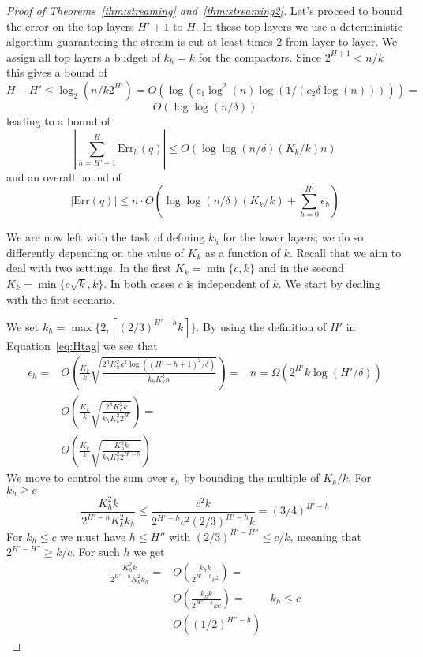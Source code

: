 \documentclass[anon,12pt]{colt2019} %
\newcommand{\eps}{\epsilon}
\newcommand{\ceil}[1]{\left \lceil #1 \right \rceil}
\newcommand{\komconstant}{c}
\begin{document}
\begin{proof} [Proof of Theorems~\ref{thm:streaming} and~\ref{thm:streaming2}]
Let's proceed to bound the error on the top layers $H'+1$ to $H$. In these top layers we use a deterministic algorithm guaranteeing the stream is cut at least times 2 from layer to layer. We assign all top layers a budget of $k_h=k$ for the compactors. Since $2^{H+1} < n/k$ this gives a bound of 
$$
H-H' \leq \log_2(n/k2^{H'}) = O\left( \log\left( c_1 \log^2(n) \log(1/(c_2 \delta \log(n))) \right)\right) = 
$$
$$
O\left( \log \log(n/\delta) \right)
$$
leading to a bound of 
$$ \left| \sum_{h=H'+1}^H \text{Err}_h(q) \right| \leq O\left( \log \log(n/\delta) (K_k/k) n \right) $$
and an overall bound of
\begin{equation} \label{eq:err total}
|\text{Err}(q)| \leq n \cdot O\left( \log \log(n/\delta)(K_k/k) + \sum_{h=0}^{H'} \eps_h \right)
\end{equation}

We are now left with the task of defining $k_h$ for the lower layers; we do so differently depending on the value of $K_k$ as a function of $k$. Recall that we aim to deal with two settings. In the first $K_k=\min\{\komconstant,k\}$ and in the second $K_k=\min\{\komconstant \sqrt{k}, k\}$. In both cases  $\komconstant$ is independent of $k$. We start by dealing with the first scenario.

We set $k_h = \max\{2, \ceil{(2/3)^{H'-h}k}\}$. By using the definition of $H'$ in Equation~\eqref{eq:Htag} we see that
\begin{align*}
\eps_h = & O\left( \frac{K_k}{k} \sqrt{\frac{2^h K_h^2 k^2 \log((H'-h+1)^2/\delta)}{k_h K_k^2 n}} \right) = & n=\Omega(2^{H'}k\log(H'/\delta)) \\
  	   &  O\left( \frac{K_k}{k} \sqrt{\frac{2^h K_h^2 k }{k_h K_k^2 2^{H'}}} \right) = \\
    	   &  O\left( \frac{K_k}{k} \sqrt{\frac{K_h^2 k }{k_h K_k^2 2^{H'-h}}} \right)
\end{align*}
We move to control the sum over $\eps_h$ by bounding the multiple of $K_k/k$. For $k_h \geq \komconstant$
$$
\frac{K_h^2 k}{2^{H'-h} K_k^2 k_{h}} \leq \frac{\komconstant^2 k}{2^{H'-h} \komconstant^2 (2/3)^{H'-h}k} =
(3/4)^{H'-h}
$$
For $k_h \leq \komconstant$ we must have $h \leq H''$ with $(2/3)^{H'-H''} \leq \komconstant/k$, meaning that $2^{H'-H''} \geq k/\komconstant$. For such $h$ we get
\begin{align*}
 \frac{K_h^2 k}{2^{H'-h} K_k^2 k_{h}} = &  O\left( \frac{ k_h k}{2^{H'-h} \komconstant^2 } \right) =  \\
    	   &  O\left( \frac{ k_h k}{2^{H''-h} k\komconstant } \right) = & k_h \leq \komconstant\\
	   &  O\left( (1/2)^{H''-h}   \right) 
\end{align*}


\end{proof}
\end{document}
